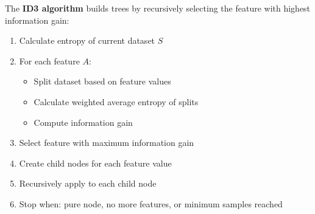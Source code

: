 \documentclass{article}
\begin{document}
The \textbf{ID3 algorithm} builds trees by recursively selecting the feature with highest information gain:

\begin{enumerate}
    \item Calculate entropy of current dataset $S$
    \item For each feature $A$:
    \begin{itemize}
        \item Split dataset based on feature values
        \item Calculate weighted average entropy of splits
        \item Compute information gain
    \end{itemize}
    \item Select feature with maximum information gain
    \item Create child nodes for each feature value
    \item Recursively apply to each child node
    \item Stop when: pure node, no more features, or minimum samples reached
\end{enumerate}
\end{document}
